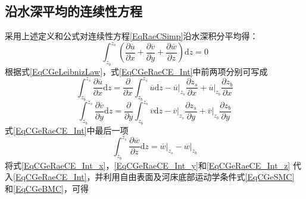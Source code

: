 \subsection{沿水深平均的连续性方程}
采用上述定义和公式对连续性方程\eqref{EqRaeCSimp}沿水深积分平均得：
\begin{equation}
  \int_{z_{b}}^{ z_{s}}\!
  \left(
  \frac{\partial \overline{u}}{\partial x} +
  \frac{\partial \overline{v}}{\partial y} +
  \frac{\partial \overline{w}}{\partial z}
  \right)
  \mathrm{d}z
  =
  0
  \label{EqCGeRaeCE_Int}
\end{equation}
根据式\eqref{EqCGeLeibnizLaw}，式\eqref{EqCGeRaeCE_Int}中前两项分别可写成
\begin{equation}
  \int_{z_{b}}^{ z_{s}}\!
  \frac{\partial \overline{u}}{\partial x}
  \mathrm{d}z
  =
  \frac{\partial}{\partial x}
  \int_{z_{b}}^{ z_{s}}\!
  \overline{u}
  \mathrm{d}z
  -
  \left.\overline{u}\right|_{z_{s}}
  \frac{\partial z_{s}}{\partial x}
  +
  \left.\overline{u}\right|_{z_{b}}
  \frac{\partial z_{b}}{\partial x}
  \label{EqCGeRaeCE_Int_x}
\end{equation}
\begin{equation}
  \int_{z_{b}}^{ z_{s}}\!
  \frac{\partial \overline{v}}{\partial y}
  \mathrm{d}z
  =
  \frac{\partial}{\partial y}
  \int_{z_{b}}^{ z_{s}}\!
  \overline{v}
  \mathrm{d}z
  -
  \left.\overline{v}\right|_{z_{s}}
  \frac{\partial z_{s}}{\partial y}
  +
  \left.\overline{v}\right|_{z_{b}}
  \frac{\partial z_{b}}{\partial y}
  \label{EqCGeRaeCE_Int_y}
\end{equation}
式\eqref{EqCGeRaeCE_Int}中最后一项
\begin{equation}
  \int_{z_{b}}^{ z_{s}}\!
  \frac{\partial \overline{w}}{\partial z}
  \mathrm{d}z
  =
  \left.\overline{w}\right|_{z_{s}}
  -
  \left.\overline{w}\right|_{z_{b}}
  \label{EqCGeRaeCE_Int_z}
\end{equation}
将式\eqref{EqCGeRaeCE_Int_x}，\eqref{EqCGeRaeCE_Int_y}和\eqref{EqCGeRaeCE_Int_z}
代入\eqref{EqCGeRaeCE_Int}，并利用自由表面及河床底部运动学条件式\eqref{EqCGeSMC}
和\eqref{EqCGeBMC}，可得
